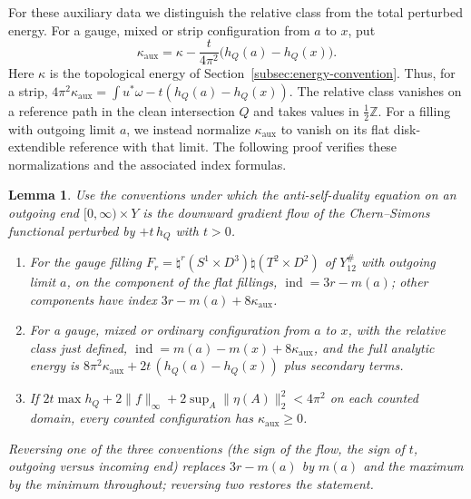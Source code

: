 \documentclass[11pt]{amsart}
\newtheorem{lemma}[theorem]{Lemma}
\theoremstyle{definition}
\theoremstyle{remark}
\theoremstyle{plain}
\numberwithin{equation}{section}
\newcommand{\ZZ}{\mathbb{Z}}
\newcommand{\ind}{\operatorname{ind}}
\begin{document}
For these auxiliary data we distinguish the relative class from the
total perturbed energy. For a gauge, mixed or strip configuration
from $a$ to $x$, put
\begin{equation}\label{eq:aux-class}
\kappa_{\mathrm{aux}}=
\kappa-\frac{t}{4\pi^2}\bigl(h_Q(a)-h_Q(x)\bigr).
\end{equation}
Here $\kappa$ is the topological energy of
Section~\ref{subsec:energy-convention}. Thus, for a strip,
$4\pi^2\kappa_{\mathrm{aux}}=
\int u^*\omega-t(h_Q(a)-h_Q(x))$.
The relative class vanishes on a reference path in the clean
intersection $Q$ and takes values in $\tfrac12\ZZ$.
For a filling with outgoing limit $a$, we instead normalize
$\kappa_{\mathrm{aux}}$ to vanish on its flat disk-extendible
reference with that limit. The following proof verifies these
normalizations and the associated index formulas.

\begin{lemma}\label{lem:aux-index}
Use the conventions under which the anti-self-duality equation on an
outgoing end $[0,\infty)\times Y$ is the downward gradient flow of the
Chern--Simons functional perturbed by $+t\,h_Q$ with $t>0$.
\begin{enumerate}[label=(\roman*)]
\item For the gauge filling $F_r=\natural^r(S^1\times D^3)\natural(T^2\times D^2)$
  of $Y_{12}^\#$ with outgoing limit $a$, on the component of the flat
  fillings, $\ind=3r-m(a)$; other components have index
  $3r-m(a)+8\kappa_{\mathrm{aux}}$.
\item For a gauge, mixed or ordinary configuration from $a$ to $x$, with
  the relative class just defined,
  $\ind=m(a)-m(x)+8\kappa_{\mathrm{aux}}$, and the full analytic energy is
  $8\pi^2\kappa_{\mathrm{aux}}+2t\,(h_Q(a)-h_Q(x))$
  plus secondary terms.
\item If $2t\max h_Q+2\|f\|_\infty+
  2\sup_A\|\eta(A)\|_2^2<4\pi^2$ on each counted domain,
  every counted configuration has $\kappa_{\mathrm{aux}}\ge0$.
\end{enumerate}
Reversing one of the three conventions (the sign of the flow, the sign of
$t$, outgoing versus incoming end) replaces $3r-m(a)$ by $m(a)$ and the
maximum by the minimum throughout; reversing two restores the statement.
\end{lemma}
\end{document}
